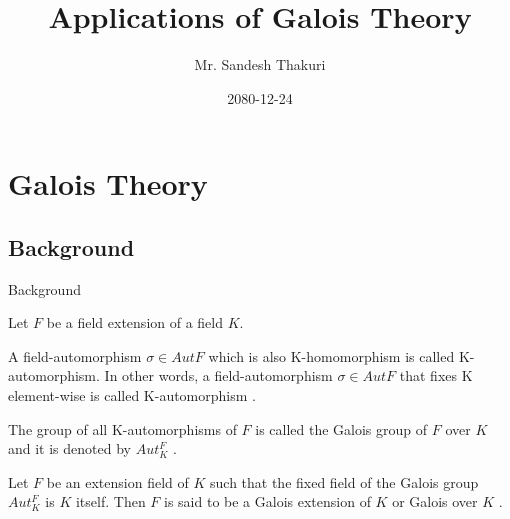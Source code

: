 \documentclass{beamer}
\title{Applications of Galois Theory}
\author[Sandesh Thakuri]{Mr. Sandesh Thakuri}
\institute[CDM, TU]
{Central Department of Mathematics, TU}
\date{2080-12-24}
\begin{document}
\myfootline

\begin{frame}[plain]
  \tikzonlytitlepage
  \titlepage
\end{frame}

\begin{frame}[plain]
  \begin{tcolorbox}[colframe=blue!80!violet, boxsep=2mm,  title={\large \bfseries Outlines}]
    \tableofcontents
  \end{tcolorbox}
\end{frame}

\small
\section{Galois Theory}
\subsection{Background}
\begin{frame}{Background}

  {\footnotesize  Let \(F\) be a field extension of a field \(K\).}
  \vspace{2mm}

  \begin{tcolorbox}[colframe=blue!40, boxsep=-1pt]
    \begin{definition}[K-automorphism]
      A field-automorphism \(\sigma \in Aut F\) which is also K-homomorphism is called K-automorphism. In other words, a field-automorphism \(\sigma \in Aut F\) that fixes K element-wise is called K-automorphism \cite{hunger}.
    \end{definition}
    \vspace{1mm}
    \begin{definition}
      The group of all K-automorphisms of \(F\) is called the Galois group of \(F\) over \(K\) and it is denoted by \(Aut_K^F\) \cite{hunger}.
    \end{definition}
    \vspace{1mm}
    \begin{definition}
      Let \(F\) be an extension field of \(K\) such that the fixed field of the Galois group \(Aut_K^F\) is \(K\) itself. Then \(F\) is said to be a Galois extension of \(K\) or Galois over \( K\) \cite{hunger}.
    \end{definition}
  \end{tcolorbox}
\end{frame}
\end{document}

